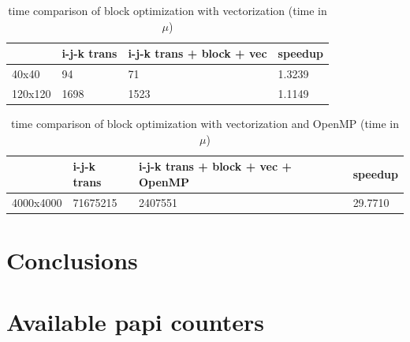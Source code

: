 \documentclass[a4paper]{report}
\begin{document}
\begin{table}[H]
\centering
\begin{tabular}{|l|l|l|l|}
\hline
        & i-j-k trans & i-j-k trans + block + vec & speedup \\ \hline
40x40   & 94          & 71                        & 1.3239  \\ \hline
120x120 & 1698        & 1523                      & 1.1149  \\ \hline
\end{tabular}
\caption{time comparison of block optimization with vectorization (time in
$\mu$)}
\end{table}

\begin{table}[H]
\centering
\begin{tabular}{|l|l|l|l|}
\hline
          & i-j-k trans & i-j-k trans + block + vec + OpenMP & speedup \\ \hline
4000x4000 & 71675215    & 2407551                            & 29.7710 \\ \hline
\end{tabular}
\caption{time comparison of block optimization with vectorization and OpenMP (time in
$\mu$)}
\end{table}

\chapter{Conclusions}

\appendix

\chapter{Available papi counters}\label{A:papi_avail}

\end{document}
